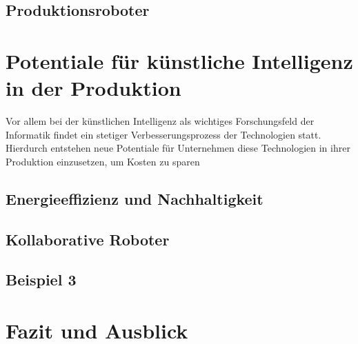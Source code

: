 \documentclass[a4paper,12pt, german]{report}
\begin{document}
\section{Produktionsroboter}



\chapter{Potentiale für künstliche Intelligenz in der Produktion}

Vor allem bei der künstlichen Intelligenz als wichtiges Forschungsfeld der Informatik findet ein stetiger Verbesserungsprozess der Technologien statt. Hierdurch entstehen neue Potentiale für Unternehmen diese Technologien in ihrer Produktion einzusetzen, um Kosten zu sparen









\section{Energieeffizienz und Nachhaltigkeit}

\section{Kollaborative Roboter}

\section{Beispiel 3}


\chapter{Fazit und Ausblick}

\listoffigures

\clearpage




\appendix
\end{document}
